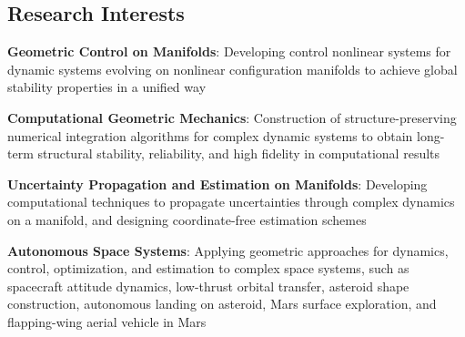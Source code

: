 \documentclass[10pt]{article}
\begin{document}
\vspace*{0.2cm}

\subsection*{Research Interests}
\begin{list}{}%
{\setlength{\leftmargin}{1.0cm}\setlength{\itemindent}{-0.5cm}
\setlength{\parsep}{0cm}\setlength{\itemsep}{0.12cm}\setlength{\parskip}{0cm}\setlength{\topsep}{0cm}\setlength{\partopsep}{0cm}}

\item \textbf{Geometric Control on Manifolds}: Developing control nonlinear systems for dynamic systems evolving on nonlinear configuration manifolds to achieve global stability properties in a unified way

\item \textbf{Computational Geometric Mechanics}: Construction of structure-preserving numerical integration algorithms for complex dynamic systems to obtain long-term structural stability, reliability, and high fidelity in computational results

\item \textbf{Uncertainty Propagation and Estimation on Manifolds}: Developing computational techniques to propagate uncertainties through complex dynamics on a manifold, and designing coordinate-free estimation schemes

\vspace*{0.2cm}





\item \textbf{Autonomous Space Systems}: Applying geometric approaches for dynamics, control, optimization, and estimation to complex space systems, such as spacecraft attitude dynamics, low-thrust orbital transfer, asteroid shape construction, autonomous landing on asteroid, Mars surface exploration, and flapping-wing aerial vehicle in Mars


\end{list}
\end{document}

